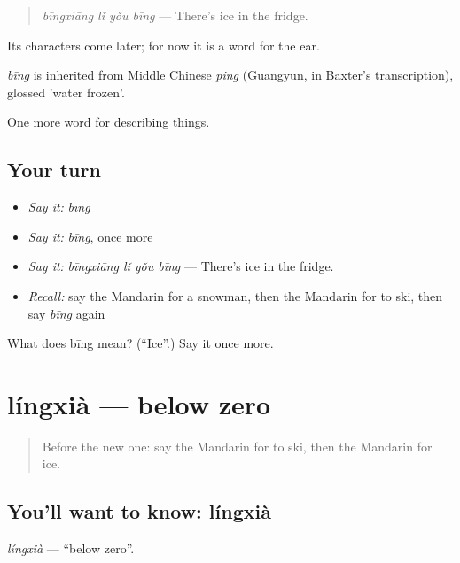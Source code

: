 \begin{quote}
\emph{bīngxiāng lǐ yǒu bīng} — There's ice in the fridge.
\end{quote}

Its characters come later; for now it is a word for the ear.

\begin{cousinweb}
\emph{bīng} is inherited from Middle Chinese \emph{ping} (Guangyun, in Baxter's transcription), glossed 'water frozen'.
\end{cousinweb}

\begin{grammarlens}[title={What you've built}]
One more word for describing things.
\end{grammarlens}

\subsection*{Your turn}
\begin{itemize}
\raggedright
  \item \emph{Say it:} \emph{bīng}
  \item \emph{Say it:} \emph{bīng}, once more
  \item \emph{Say it:} \emph{bīngxiāng lǐ yǒu bīng} — There's ice in the fridge.
  \item \emph{Recall:} say the Mandarin for a snowman, then the Mandarin for to ski, then say \emph{bīng} again
\end{itemize}

\begin{tcolorbox}[breakable,colback=teal!4,colframe=teal!35!black,title={Before you move on}]
What does bīng mean? (\textquotedblleft{}Ice\textquotedblright{}.) Say it once more.
\end{tcolorbox}
\section[língxià]{língxià — below zero}

\label{lesson:ZH-C221-lingxia}



\begin{quote}
Before the new one: say the Mandarin for to ski, then the Mandarin for ice.
\end{quote}

\subsection*{You'll want to know: língxià}
\emph{língxià} — \textquotedblleft{}below zero\textquotedblright{}.

